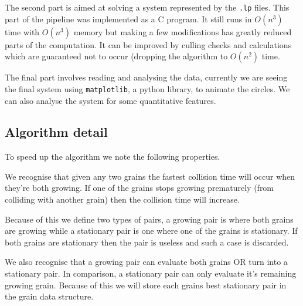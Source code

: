 \documentclass{article}
\begin{document}
The second part is aimed at solving a system represented by the \texttt{.lp}
files. This part of the pipeline was implemented as a C program. It still
runs in $O(n^3)$ time with $O(n^3)$ memory but making a few modifications has
greatly reduced parts of the computation. It can be improved by culling
checks and calculations which are guaranteed not to occur (dropping the algorithm
to $O(n^2)$ time.

The final part involves reading and analysing the data, currently we are
seeing the final system using \texttt{matplotlib}, a python library, to animate
the circles. We can also analyse the system for some quantitative features.

\subsection{Algorithm detail}
To speed up the algorithm we note the following properties.

We recognise that given any two grains the fastest collision time
will occur when they're both growing. If one of the grains stops growing
prematurely (from colliding with another grain) then the collision time
will increase.

Because of this we define two types of pairs, a growing pair is where
both grains are growing while a stationary pair is one where one of the
grains is stationary. If both grains are stationary then the pair is
useless and such a case is discarded.

We also recognise that a growing pair can evaluate both grains OR
turn into a stationary pair. In comparison, a stationary pair can only
evaluate it's remaining growing grain.
Because of this we will store each grains best stationary pair in
the grain data structure.
\end{document}
